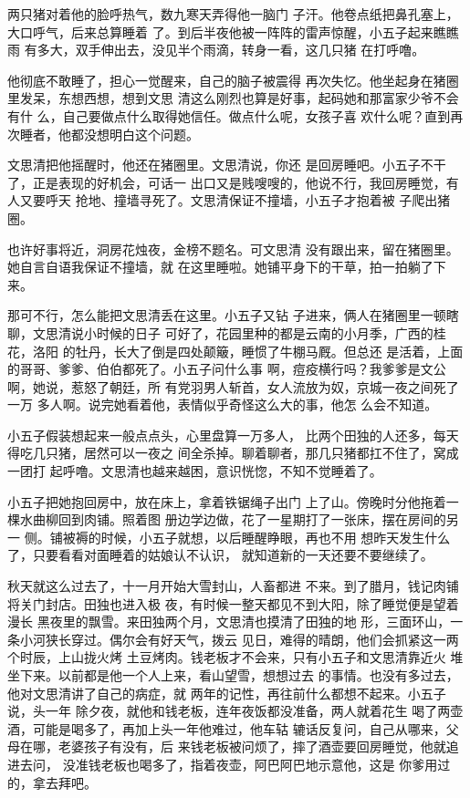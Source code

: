 两只猪对着他的脸呼热气，数九寒天弄得他一脑门
子汗。他卷点纸把鼻孔塞上，大口呼气，后来总算睡着
了。到后半夜他被一阵阵的雷声惊醒，小五子起来瞧瞧雨
有多大，双手伸出去，没见半个雨滴，转身一看，这几只猪
在打呼噜。

他彻底不敢睡了，担心一觉醒来，自己的脑子被震得
再次失忆。他坐起身在猪圈里发呆，东想西想，想到文思
清这么刚烈也算是好事，起码她和那富家少爷不会有什
么，自己要做点什么取得她信任。做点什么呢，女孩子喜
欢什么呢？直到再次睡者，他都没想明白这个问题。

文思清把他摇醒时，他还在猪圈里。文思清说，你还
是回房睡吧。小五子不干了，正是表现的好机会，可话一
出口又是贱嗖嗖的，他说不行，我回房睡觉，有人又要呼天
抢地、撞墙寻死了。文思清保证不撞墙，小五子才抱着被
子爬出猪圈。

也许好事将近，洞房花烛夜，金榜不题名。可文思清
没有跟出来，留在猪圈里。她自言自语我保证不撞墙，就
在这里睡啦。她铺平身下的干草，拍一拍躺了下来。

那可不行，怎么能把文思清丢在这里。小五子又钻
子进来，俩人在猪圈里一顿瞎聊，文思清说小时候的日子
可好了，花园里种的都是云南的小月季，广西的桂花，洛阳
的牡丹，长大了倒是四处颠簸，睡惯了牛棚马厩。但总还
是活着，上面的哥哥、爹爹、伯伯都死了。小五子问什么事
啊，痘疫横行吗？我爹爹是文公啊，她说，惹怒了朝廷，所
有党羽男人斩首，女人流放为奴，京城一夜之间死了一万
多人啊。说完她看着他，表情似乎奇怪这么大的事，他怎
么会不知道。

小五子假装想起来一般点点头，心里盘算一万多人，
比两个田独的人还多，每天得吃几只猪，居然可以一夜之
间全杀掉。聊着聊者，那几只猪都扛不住了，窝成一团打
起呼噜。文思清也越来越困，意识恍惚，不知不觉睡着了。

小五子把她抱回房中，放在床上，拿着铁锯绳子出门
上了山。傍晚时分他拖着一棵水曲柳回到肉铺。照着图
册边学边做，花了一星期打了一张床，摆在房间的另一
侧。铺被褥的时候，小五子就想，以后睡醒睁眼，再也不用
想昨天发生什么了，只要看看对面睡着的姑娘认不认识，
就知道新的一天还要不要继续了。
\newline

秋天就这么过去了，十一月开始大雪封山，人畜都进
不来。到了腊月，钱记肉铺将关门封店。田独也进入极
夜，有时候一整天都见不到大阳，除了睡觉便是望着漫长
黑夜里的飘雪。来田独两个月，文思清也摸清了田独的地
形，三面环山，一条小河狭长穿过。偶尔会有好天气，拨云
见日，难得的晴朗，他们会抓紧这一两个时辰，上山拢火烤
土豆烤肉。钱老板才不会来，只有小五子和文思清靠近火
堆坐下来。以前都是他一个人上来，看山望雪，想想过去
的事情。也没有多过去，他对文思清讲了自己的病症，就
两年的记性，再往前什么都想不起来。小五子说，头一年
除夕夜，就他和钱老板，连年夜饭都没准备，两人就着花生
喝了两壶酒，可能是喝多了，再加上头一年他难过，他车轱
辘话反复问，自己从哪来，父母在哪，老婆孩子有没有，后
来钱老板被问烦了，摔了酒壶要回房睡觉，他就追进去问，
没准钱老板也喝多了，指着夜壶，阿巴阿巴地示意他，这是
你爹用过的，拿去拜吧。


